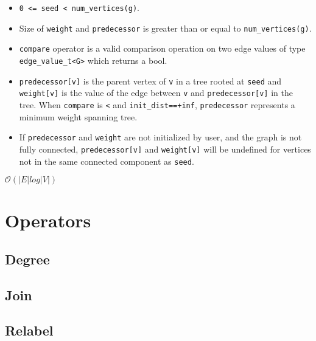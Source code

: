 {\small
      
}
\begin{itemdescr}
      \pnum\preconditions
      \begin{itemize}
            \item
                  \lstinline{0 <= seed < num_vertices(g)}.
            \item
                  Size of \lstinline{weight} and \lstinline{predecessor} is greater than or equal to \lstinline{num_vertices(g)}.
            \item
                  \lstinline{compare} operator is a valid comparison operation on two edge values of type \lstinline{edge_value_t<G>} which returns a bool.
      \end{itemize}
      \pnum\effects
      \begin{itemize}
            \item
                  \lstinline{predecessor[v]} is the parent vertex of \lstinline{v} in a tree rooted at \lstinline{seed} and \lstinline{weight[v]} is the value of the edge between \lstinline{v} and \lstinline{predecessor[v]} in the tree. When \lstinline{compare} is \lstinline{<} and \lstinline{init_dist==+inf}, \lstinline{predecessor} represents a minimum weight spanning tree.
            \item
                  If \lstinline{predecessor} and \lstinline{weight} are not initialized by user, and the graph is not fully connected, \lstinline{predecessor[v]} and \lstinline{weight[v]} will be undefined for vertices not in the same connected component as \lstinline{seed}.
      \end{itemize}
      \pnum\complexity $\mathcal{O}(|E|log|V|)$
\end{itemdescr}

\section{Operators}
\subsection{Degree}

\subsection{Join}

\subsection{Relabel}


